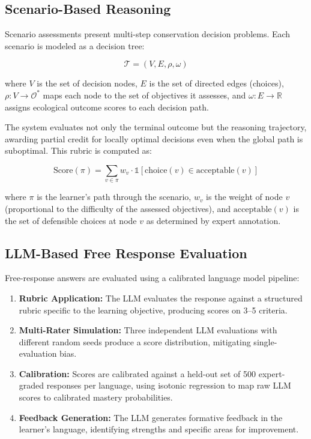 \documentclass[11pt,a4paper]{article}
\begin{document}
\subsection{Scenario-Based Reasoning}

Scenario assessments present multi-step conservation decision problems.
Each scenario is modeled as a decision tree:

\begin{equation}
    \mathcal{T} = (V, E, \rho, \omega)
\end{equation}

\noindent where $V$ is the set of decision nodes, $E$ is the set of directed edges (choices), $\rho: V \rightarrow \mathcal{O}^*$ maps each node to the set of objectives it assesses, and $\omega: E \rightarrow \mathbb{R}$ assigns ecological outcome scores to each decision path.

The system evaluates not only the terminal outcome but the reasoning trajectory, awarding partial credit for locally optimal decisions even when the global path is suboptimal.
This rubric is computed as:

\begin{equation}
    \text{Score}(\pi) = \sum_{v \in \pi} w_v \cdot \mathbb{1}[\text{choice}(v) \in \text{acceptable}(v)]
\end{equation}

\noindent where $\pi$ is the learner's path through the scenario, $w_v$ is the weight of node $v$ (proportional to the difficulty of the assessed objectives), and $\text{acceptable}(v)$ is the set of defensible choices at node $v$ as determined by expert annotation.

\subsection{LLM-Based Free Response Evaluation}

Free-response answers are evaluated using a calibrated language model pipeline:

\begin{enumerate}[leftmargin=*]
    \item \textbf{Rubric Application:} The LLM evaluates the response against a structured rubric specific to the learning objective, producing scores on 3--5 criteria.
    \item \textbf{Multi-Rater Simulation:} Three independent LLM evaluations with different random seeds produce a score distribution, mitigating single-evaluation bias.
    \item \textbf{Calibration:} Scores are calibrated against a held-out set of 500 expert-graded responses per language, using isotonic regression to map raw LLM scores to calibrated mastery probabilities.
    \item \textbf{Feedback Generation:} The LLM generates formative feedback in the learner's language, identifying strengths and specific areas for improvement.
\end{enumerate}
\end{document}
